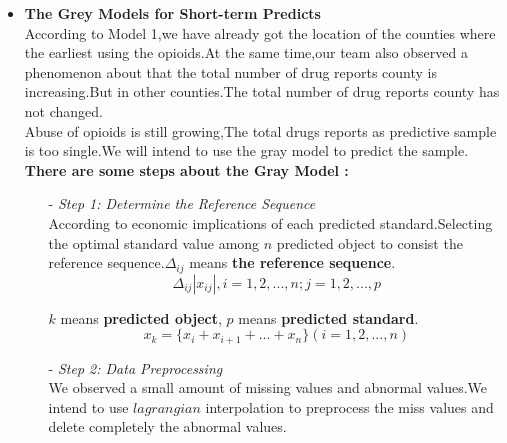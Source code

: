 \documentclass{mcmthesis}
\begin{document}
\begin{itemize}
	\item \textbf{The Grey Models for Short-term Predicts } \\%
	According to Model 1,we have already got the location of the counties where the earliest using the opioids.At the same time,our team also observed a phenomenon about that the total number of drug reports county is increasing.But in other counties.The total number of drug reports county has not changed.\\
		
	Abuse of opioids is still growing,The total drugs reports as predictive sample is too single.We will intend to use the gray model to predict the sample.\\
	
	\textbf{There are some steps about the Gray Model : } \\%
	\begin{itemize}	
		\item[-] \textit{Step 1: Determine the Reference Sequence} \\%
	    According to economic implications of each predicted standard.Selecting the optimal standard value among $n$ predicted object to consist the reference sequence.${\Delta _{ij}}$ means \textbf{the reference sequence}.\\
	    \begin{equation}
	    {\Delta _{ij}}\left. {\left| {{x_{ij}}} \right.} \right|,i = 1,2,...,n;j = 1,2,...,p
	    \end{equation}
	    
	    $k$ means \textbf{predicted object}, $p$ means \textbf{predicted standard}.\\
		\begin{equation}
			{x_k} = \{ {x_i} + {x_{i + 1}} + ... + {x_n}\}    (i = 1,2,...,n)
		\end{equation}
		
		\item [-] \textit{Step 2: Data Preprocessing} \\ %
		We observed a small amount of missing values and abnormal values.We intend to use $lagrangian$ interpolation to  preprocess the miss values and delete completely the abnormal values.\\
		

\end{itemize}
\end{itemize}
\end{document}
